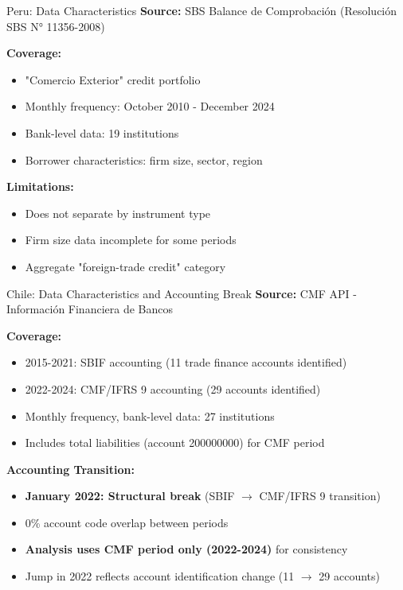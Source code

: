 \documentclass[aspectratio=169,11pt]{beamer}
\begin{document}
\begin{frame}{Peru: Data Characteristics}
\textbf{Source:} SBS Balance de Comprobación (Resolución SBS N° 11356-2008)

\vspace{0.3cm}
\textbf{Coverage:}
\begin{itemize}
    \item "Comercio Exterior" credit portfolio
    \item Monthly frequency: October 2010 - December 2024
    \item Bank-level data: 19 institutions
    \item Borrower characteristics: firm size, sector, region
\end{itemize}

\vspace{0.3cm}
\textbf{Limitations:}
\begin{itemize}
    \item Does not separate by instrument type
    \item Firm size data incomplete for some periods
    \item Aggregate "foreign-trade credit" category
\end{itemize}
\end{frame}

\begin{frame}{Chile: Data Characteristics and Accounting Break}
\textbf{Source:} CMF API - Información Financiera de Bancos

\vspace{0.3cm}
\textbf{Coverage:}
\begin{itemize}
    \item 2015-2021: SBIF accounting (11 trade finance accounts identified)
    \item 2022-2024: CMF/IFRS 9 accounting (29 accounts identified)
    \item Monthly frequency, bank-level data: 27 institutions
    \item Includes total liabilities (account 200000000) for CMF period
\end{itemize}

\vspace{0.3cm}
\textbf{Accounting Transition:}
\begin{itemize}
    \item \textbf{January 2022: Structural break} (SBIF $\rightarrow$ CMF/IFRS 9 transition)
    \item 0\% account code overlap between periods
    \item \textbf{Analysis uses CMF period only (2022-2024)} for consistency
    \item Jump in 2022 reflects account identification change (11 $\rightarrow$ 29 accounts)
\end{itemize}
\end{frame}
\end{document}
